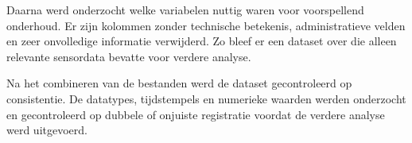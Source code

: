 
Daarna werd onderzocht welke variabelen nuttig waren voor voorspellend onderhoud. Er zijn kolommen zonder technische betekenis, administratieve velden en zeer onvolledige informatie verwijderd. Zo bleef er een dataset over die alleen relevante sensordata bevatte voor verdere analyse.




Na het combineren van de bestanden werd de dataset gecontroleerd op consistentie. De datatypes, tijdstempels en numerieke waarden werden onderzocht en gecontroleerd op dubbele of onjuiste registratie voordat de verdere analyse werd uitgevoerd.

